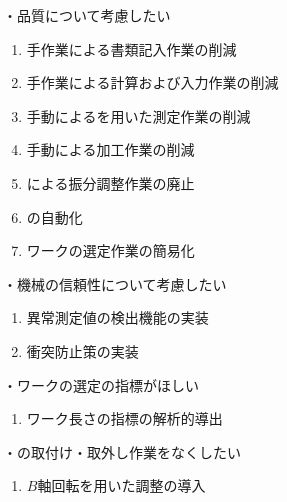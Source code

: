 \clearpage
・品質について考慮したい
\begin{enumerate}[label=\sarrow]
\item 手作業による書類記入作業の削減
\item 手作業による計算および入力作業の削減
\item 手動による\TouchSensorProbe を用いた測定作業の削減
\item 手動による加工作業の削減
\item \Spacer による振分調整作業の廃止
\item \CurvedOutcutMilling の自動化
\item ワーク\FixtureBolt の選定作業の簡易化
\end{enumerate}



・機械の信頼性について考慮したい
\begin{enumerate}[label=\sarrow]
\item 異常測定値の検出機能の実装
\item 衝突防止策の実装
\end{enumerate}



・ワーク\FixtureBolt の選定の指標がほしい
\begin{enumerate}[label=\sarrow]
\item ワーク\FixtureBolt 長さの指標の解析的導出
\end{enumerate}
・\Spacer の取付け・取外し作業をなくしたい
\begin{enumerate}[label=\sarrow]
\item $B$軸回転を用いた\AlocationLength 調整の導入
\end{enumerate}



